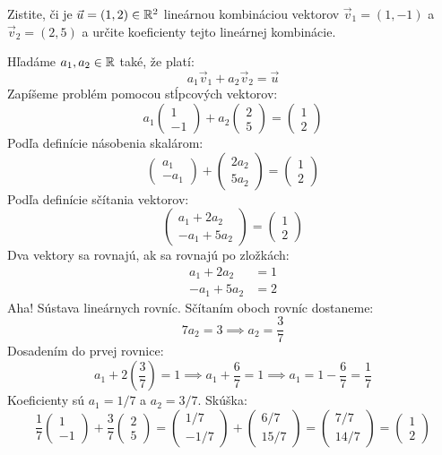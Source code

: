 \begin{example}
Zistite, či je $\vec{u}=(1,2) \in \mathbb{R}^2$ lineárnou kombináciou vektorov $\vec{v}_1=(1,-1)$ a $\vec{v}_2=(2,5)$ a určite koeficienty tejto lineárnej kombinácie.

Hľadáme $a_1, a_2 \in \mathbb{R}$ také, že platí:
$$ a_1 \vec{v}_1 + a_2 \vec{v}_2 = \vec{u} $$
Zapíšeme problém pomocou stĺpcových vektorov:
$$ a_1 \begin{pmatrix} 1 \\ -1 \end{pmatrix} + a_2 \begin{pmatrix} 2 \\ 5 \end{pmatrix} = \begin{pmatrix} 1 \\ 2 \end{pmatrix} $$
Podľa definície násobenia skalárom:
$$ \begin{pmatrix} a_1 \\ -a_1 \end{pmatrix} + \begin{pmatrix} 2a_2 \\ 5a_2 \end{pmatrix} = \begin{pmatrix} 1 \\ 2 \end{pmatrix} $$
Podľa definície sčítania vektorov:
$$ \begin{pmatrix} a_1 + 2a_2 \\ -a_1 + 5a_2 \end{pmatrix} = \begin{pmatrix} 1 \\ 2 \end{pmatrix} $$
Dva vektory sa rovnajú, ak sa rovnajú po zložkách:
\begin{align*}
    a_1 + 2a_2 &= 1 \\
    -a_1 + 5a_2 &= 2
\end{align*}
Aha! Sústava lineárnych rovníc.
Sčítaním oboch rovníc dostaneme:
$$ 7a_2 = 3 \implies a_2 = \frac{3}{7} $$
Dosadením do prvej rovnice:
$$ a_1 + 2\left(\frac{3}{7}\right) = 1 \implies a_1 + \frac{6}{7} = 1 \implies a_1 = 1 - \frac{6}{7} = \frac{1}{7} $$
Koeficienty sú $a_1=1/7$ a $a_2=3/7$.
Skúška:
$$ \frac{1}{7} \begin{pmatrix} 1 \\ -1 \end{pmatrix} + \frac{3}{7} \begin{pmatrix} 2 \\ 5 \end{pmatrix} = \begin{pmatrix} 1/7 \\ -1/7 \end{pmatrix} + \begin{pmatrix} 6/7 \\ 15/7 \end{pmatrix} = \begin{pmatrix} 7/7 \\ 14/7 \end{pmatrix} = \begin{pmatrix} 1 \\ 2 \end{pmatrix} $$
\end{example}
